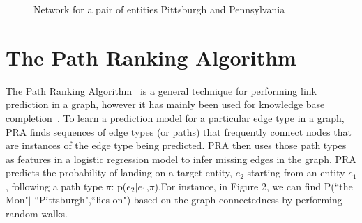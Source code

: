 \documentclass[11pt,a4paper]{article}
\begin{document}
\begin{figure}
  \caption{Network for a pair of entities Pittsburgh and Pennsylvania}
  \label{fig:M1}
\end{figure}

\section{The Path Ranking Algorithm}

The Path Ranking Algorithm~\cite{lao-2010-pra}  is a general technique for
performing link prediction in a graph, however it has mainly been used for
knowledge base
completion~\cite{lao-2011-pra2,gardner-2013-latent-pra,gardner-2014-vector-space-pra}.
To learn a prediction model for a particular edge type in a graph, PRA finds
sequences of edge types (or paths) that frequently connect nodes that are
instances of the edge type being predicted. PRA then uses those path types as
features in a logistic regression model to infer missing edges in the graph.
PRA predicts the probability of landing on a target entity, $e_2$ starting from
an entity $e_1$, following a path type $\pi$: p($e_2|e_1$,$\pi$).For instance,
in Figure 2, we can find P(``the Mon"$|$ ``Pittsburgh",``lies on") based on the
graph connectedness by performing random walks.
\end{document}
